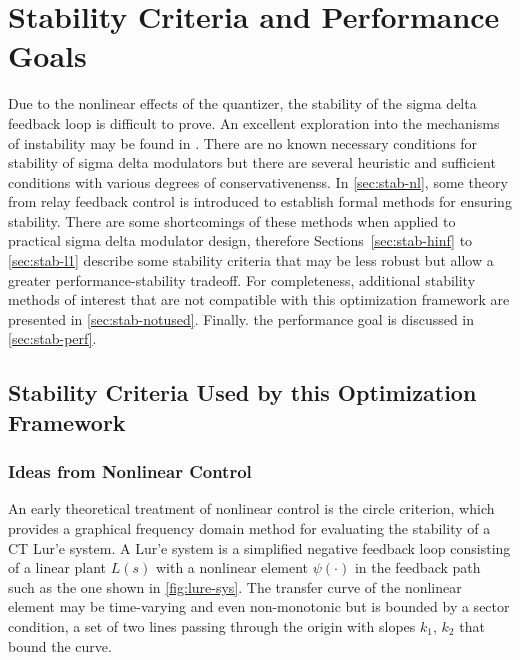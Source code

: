 
\chapter{Stability Criteria and Performance Goals}
\label{ch:Stability}

Due to the nonlinear effects of the quantizer, the stability of the sigma delta feedback loop is difficult to prove. An excellent exploration into the mechanisms of instability may be found in \cite{Risbo1994}. There are no known necessary conditions for stability of sigma delta modulators but there are several heuristic and sufficient conditions with various degrees of conservativenenss. In \autoref{sec:stab-nl}, some theory from relay feedback control is introduced to establish formal methods for ensuring stability. There are some shortcomings of these methods when applied to practical sigma delta modulator design, therefore Sections~\ref{sec:stab-hinf} to \ref{sec:stab-l1} describe some stability criteria that may be less robust but allow a greater performance-stability tradeoff. For completeness, additional stability methods of interest that are not compatible with this optimization framework are presented in \autoref{sec:stab-notused}. Finally. the performance goal is discussed in \autoref{sec:stab-perf}.

\section{Stability Criteria Used by this Optimization Framework}
\label{sec:stab-used}

\subsection{Ideas from Nonlinear Control}
\label{sec:stab-nl}

An early theoretical treatment of nonlinear control is the circle criterion, which provides a graphical frequency domain method for evaluating the stability of a \gls{CT} Lur'e system. A Lur'e system is a simplified negative feedback loop consisting of a linear plant $L(s)$ with a nonlinear element $\psi(\cdot)$ in the feedback path such as the one shown in \autoref{fig:lure-sys}. The transfer curve of the nonlinear element may be time-varying and even non-monotonic but is bounded by a sector condition, a set of two lines passing through the origin with slopes $k_1$, $k_2$ that bound the curve.


